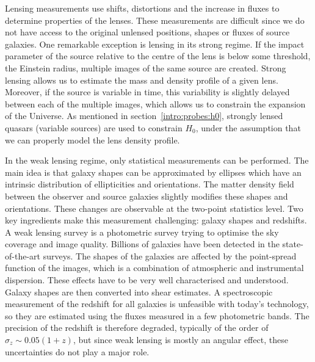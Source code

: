     Lensing measurements use shifts, distortions and the increase in fluxes to determine 
    properties of the lenses. These measurements are difficult since we do not have access to 
    the original unlensed positions, shapes or fluxes of source galaxies. 
    One remarkable exception is lensing in its strong regime. 
    If the impact parameter of the source relative to the centre of the lens is below some threshold, 
    the Einstein radius, multiple images of the same source are created. 
    Strong lensing allows us to estimate the mass and density profile of a given lens. 
    Moreover, if the source is variable in time, this variability is slightly delayed 
    between each of the multiple images, which allows us to constrain the expansion 
    of the Universe. As mentioned in section~\ref{intro:probes:h0}, strongly lensed 
    quasars (variable sources) are used to constrain $H_0$, under the assumption 
    that we can properly model the lens density profile. 

    In the weak lensing regime, only statistical measurements can be performed. 
    The main idea is that galaxy shapes can be approximated by ellipses which have 
    an intrinsic distribution of ellipticities and orientations. 
    The matter density field between the observer and source galaxies slightly modifies 
    these shapes and orientations. 
    These changes are observable at the two-point statistics level. 
    Two key ingredients make this measurement challenging: galaxy shapes and redshifts. 
    A weak lensing survey is a photometric survey trying to optimise the sky coverage and 
    image quality. Billions of galaxies have been detected in the state-of-the-art surveys. 
    The shapes of the galaxies are affected by the point-spread function of the images, 
    which is a combination of atmospheric and instrumental dispersion. 
    These effects have to be very well characterised and understood. 
    Galaxy shapes are then converted into shear estimates. 
    A spectroscopic measurement of the redshift for all galaxies is unfeasible with today's technology,
    so they are estimated using the fluxes measured in a few photometric bands. 
    The precision of the redshift is therefore degraded, typically of the order of $\sigma_z \sim 0.05(1+z)$, 
    but since weak lensing is mostly an angular effect, these uncertainties do not play a major role. 
    
